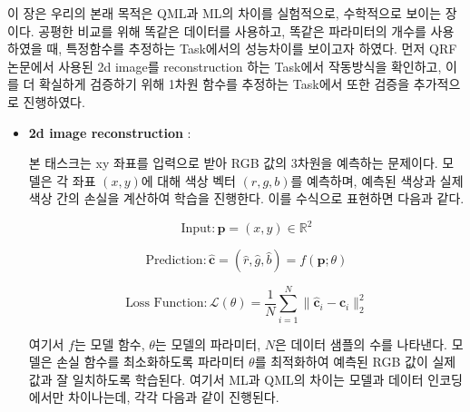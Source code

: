 이 장은 우리의 본래 목적은 QML과 ML의 차이를 실험적으로, 수학적으로 보이는 장이다. 공평한 비교를 위해 똑같은 데이터를 사용하고, 똑같은 파라미터의 개수를 사용하였을 때, 특정함수를 추정하는 Task에서의 성능차이를 보이고자 하였다. 먼저 QRF논문에서 사용된 2d image를 reconstruction 하는 Task에서 작동방식을 확인하고, 이를 더 확실하게 검증하기 위해 1차원 함수를 추정하는 Task에서 또한 검증을 추가적으로 진행하였다.
\begin{itemize}
    \item \textbf{2d image reconstruction} :

        본 태스크는 xy 좌표를 입력으로 받아 RGB 값의 3차원을 예측하는 문제이다. 모델은 각 좌표 \((x, y)\)에 대해 색상 벡터 \((r, g, b)\)를 예측하며, 예측된 색상과 실제 색상 간의 손실을 계산하여 학습을 진행한다. 이를 수식으로 표현하면 다음과 같다.

            \[
            \text{Input}: \mathbf{p} = (x, y) \in \mathbb{R}^2
            \]

            \[
            \text{Prediction}: \hat{\mathbf{c}} = (\hat{r}, \hat{g}, \hat{b}) = f(\mathbf{p}; \theta)
            \]

            \[
            \text{Loss Function}: \mathcal{L}(\theta) = \frac{1}{N} \sum_{i=1}^{N} \| \hat{\mathbf{c}}_i - \mathbf{c}_i \|_2^2
            \]




            여기서 \(f\)는 모델 함수, \(\theta\)는 모델의 파라미터, \(N\)은 데이터 샘플의 수를 나타낸다. 모델은 손실 함수를 최소화하도록 파라미터 \(\theta\)를 최적화하여 예측된 RGB 값이 실제 값과 잘 일치하도록 학습된다. 여기서 ML과 QML의 차이는 모델과 데이터 인코딩에서만 차이나는데, 각각 다음과 같이 진행된다.



\end{itemize}
